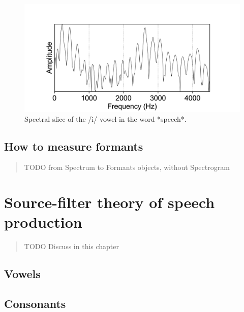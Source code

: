 \documentclass[
]{book}
\begin{document}
\begin{figure}

{\centering \includegraphics{figures/speech_word_0_210_spectrum} 

}

\caption{Spectral slice of the /i/ vowel in the word *speech*.}\label{fig:speech-spectralslice-i}
\end{figure}

\subsection{How to measure formants}\label{how-to-measure-formants}

\begin{quote}
TODO from Spectrum to Formants objects, without Spectrogram
\end{quote}

\section{Source-filter theory of speech production}\label{source-filter-theory-of-speech-production}

\begin{quote}
TODO Discuss in this chapter
\end{quote}

\subsection{Vowels}\label{vowels}

\subsection{Consonants}\label{consonants}

  
\end{document}
